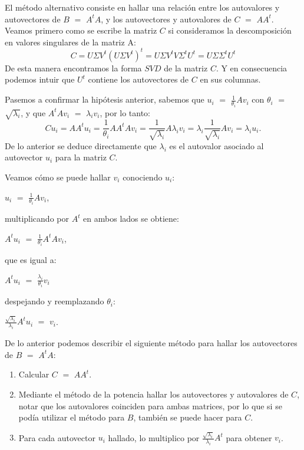
El método alternativo consiste en hallar una relación entre los autovalores y autovectores de $B$ $=$ $A^{t} A$, y los autovectores y autovalores de $C$ $=$ $A A^{t}$.
Veamos primero como se escribe la matriz $C$ si consideramos la descomposición en valores singulares de la matriz A:
\begin{equation}
C = U \Sigma V^t (U \Sigma V^t)^{t} = U \Sigma V^t V \Sigma^{t} U^{t}  = U \Sigma \Sigma^{t} U^{t} 
\end{equation}
De esta manera encontramos la forma $SVD$ de la matriz $C$. Y en consecuencia podemos intuir que $U^{t}$ contiene los autovectores de $C$ en sus columnas.

Pasemos a confirmar la hipótesis anterior, sabemos que $u_{i}$ $=$ $\frac{1}{ \theta_{i} } A v_{i}$ con $\theta_{i}$ $=$ $\sqrt{ \lambda_{i} }$, y que $A^{t} A v_{i}$ $=$ $\lambda_{i} v_{i}$, por lo tanto:
\begin{equation}
C u_{i} = A A^{t} u_{i} = \frac{1}{ \theta_{i} } A A^{t}  A v_{i} =  \frac{ 1 }{ \sqrt{ \lambda_{i} } } A  \lambda_{i} v_{i} =  \lambda_{i} \frac{ 1 }{ \sqrt{ \lambda_{i} } } A  v_{i} = \lambda_{i} u_{i}.
\end{equation}
De lo anterior se deduce directamente que $\lambda_{i}$ es el autovalor asociado al autovector $u_{i}$ para la matriz $C$.

Veamos cómo se puede hallar $v_{i}$ conociendo $u_{i}$:

$u_{i}$ $=$ $\frac{1}{ \theta_{i} } A v_{i}$, 

multiplicando por $A^{t}$ en ambos lados se obtiene:

$A^{t} u_{i}$ $=$ $ \frac{1}{ \theta_{i} } A^{t} A v_{i}$, 

que es igual a: 

$A^{t} u_{i}$ $=$ $\frac{\lambda_{i}}{ \theta_{i} }  v_{i}$ 

despejando y reemplazando $\theta_{i}$:

$\frac{ \sqrt{\lambda_{i} } }{ \lambda_{i} }  A^{t} u_{i}$ $=$ $v_{i}$.

De lo anterior podemos describir el siguiente método para hallar los autovectores de $B$ $=$ $A^{t} A$:
\begin{enumerate}
\setlength{\itemindent}{0.2in}
\item Calcular $C$ $=$ $A A^{t}$.
\item Mediante el método de la potencia hallar los autovectores y autovalores de $C$, notar que los autovalores coinciden para ambas matrices, por lo que si  se podía utilizar el método para $B$, también se puede hacer para $C$.
\item Para cada autovector $u_{i}$ hallado, lo multiplico por $\frac{ \sqrt{\lambda_{i} } }{ \lambda_{i} }  A^{t}$ para obtener $v_{i}$.
\end{enumerate}


